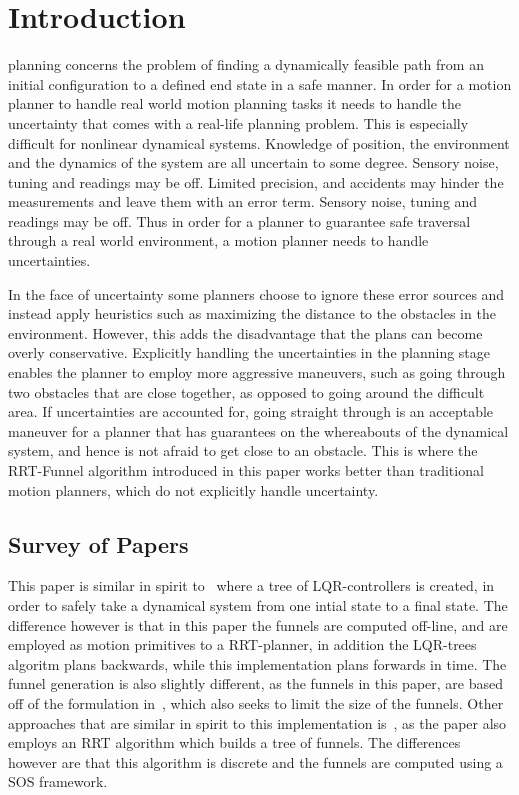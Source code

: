 
\section{Introduction}
 planning concerns the problem of finding a dynamically
feasible path from an initial configuration to a defined end state in a safe
manner. In order for a motion planner to handle real world motion planning tasks
it needs to handle the uncertainty that comes with a real-life planning problem.
This is especially difficult for nonlinear dynamical systems. Knowledge of
position, the environment and the dynamics of the system are all uncertain to
some degree. Sensory noise, tuning and readings may be off. Limited precision,
and accidents may hinder the measurements and leave them with an error term.
Sensory noise, tuning and readings may be off. Thus in order for a planner to
guarantee safe traversal through a real world environment, a motion planner
needs to handle uncertainties.

In the face of uncertainty some planners choose to ignore these error sources
and instead apply heuristics such as maximizing the distance to the obstacles in
the environment. However, this adds the disadvantage that the plans can become
overly conservative. Explicitly handling the uncertainties in the planning stage
enables the planner to employ more aggressive maneuvers, such as going through
two obstacles that are close together, as opposed to going around the difficult
area. If uncertainties are accounted for, going straight through is an
acceptable maneuver for a planner that has guarantees on the whereabouts of the
dynamical system, and hence is not afraid to get close to an obstacle. This is
where the RRT-Funnel algorithm introduced in this paper works better than
traditional motion planners, which do not explicitly handle uncertainty.

\subsection{Survey of Papers}

This paper is similar in spirit to~\cite{tedrakeLQRtreesFeedbackMotion2009}
where a tree of LQR-controllers is created, in order to safely take a dynamical
system from one intial state to a final state. The difference however is that in
this paper the funnels are computed off-line, and are employed as motion
primitives to a RRT-planner, in addition the LQR-trees algoritm plans backwards,
while this implementation plans forwards in time. The funnel generation is also
slightly different, as the funnels in this paper, are based off of the
formulation in~\cite{majumdarFunnelLibrariesRealtime2017}, which also seeks to
limit the size of the funnels. Other approaches that are similar in spirit to
this implementation is~\cite{lenySequentialCompositionRobust2012}, as the paper
also employs an RRT algorithm which builds a tree of funnels. The differences
however are that this algorithm is discrete and the funnels are computed using a
SOS framework.


